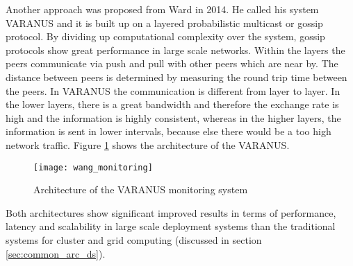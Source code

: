 Another approach was proposed from Ward \cite{Ward_2014} in 2014. He called his system VARANUS and it is built up on a layered probabilistic multicast or gossip protocol. By dividing up computational complexity over the system, gossip protocols show great performance in large scale networks. Within the layers the peers communicate via push and pull with other peers which are near by. The distance between peers is determined by measuring the round trip time between the peers. In VARANUS the communication is different from layer to layer. In the lower layers, there is a great bandwidth and therefore the exchange rate is high and the information is highly consistent, whereas in the higher layers, the information is sent in lower intervals, because else there would be a too high network traffic.
Figure \ref{fig:ward_varnus_architecture} shows the architecture of the VARANUS.
\begin{figure}
	\centering
		\texttt{[image: wang\_monitoring]}
	\caption{Architecture of the VARANUS monitoring system \cite{Ward_2014}}
	\label{fig:ward_varnus_architecture}
\end{figure}

Both architectures show significant improved results in terms of performance, latency and scalability in large scale deployment systems than the traditional systems for cluster and grid computing (discussed in section \ref{sec:common_arc_ds}).